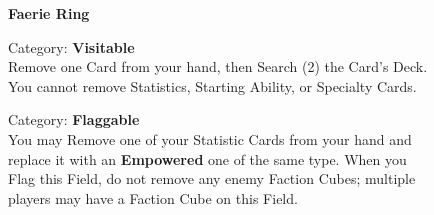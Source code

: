 \begin{figure}[H]
  \begin{minipage}[t]{0.47\textwidth}
    \vspace{0pt}
    \centering
    \phantom{j}\textbf{Faerie Ring}\phantom{j}\par
    \caption{\small Category: \textbf{Visitable}\\
      Remove one Card from your hand, then Search (2) the Card's Deck.
      You cannot remove Statistics, Starting Ability, or Specialty Cards.}
  \end{minipage}\hfill
  \begin{minipage}[t]{0.47\textwidth}
    \vspace{0pt}
    \centering
    \phantom{j}\phantom{j}\par
    \caption{\small Category: \textbf{Flaggable}\\
      You may Remove one of your Statistic Cards from your hand and replace it with an \textbf{Empowered} one of the same type.
      When you Flag this Field, do not remove any enemy Faction Cubes; multiple players may have a Faction Cube on this Field.}
  \end{minipage}
\end{figure}

